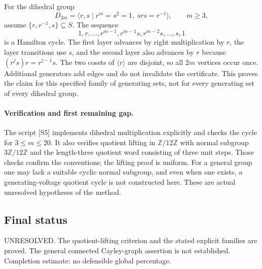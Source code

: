 \documentclass[11pt,a4paper]{article}
\begin{document}
For the dihedral group
\[
 D_{2m}=\langle r,s\mid r^m=s^2=1,\ srs=r^{-1}\rangle,
 \qquad m\ge3,
\]
assume $\{r,r^{-1},s\}\subseteq S$. The sequence
\[
 1,r,\ldots,r^{m-1},r^{m-1}s,r^{m-2}s,\ldots,s,1
\]
is a Hamilton cycle. The first layer advances by right multiplication
by $r$, the layer transitions use $s$, and the second layer also
advances by $r$ because $(r^j s)r=r^{j-1}s$. The two cosets of
$\langle r\rangle$ are disjoint, so all $2m$ vertices occur once.
Additional generators add edges and do not invalidate the certificate.
This proves the claim for this specified family of generating sets,
not for every generating set of every dihedral group.

\paragraph{Verification and first remaining gap.}
The script [S5] implements dihedral multiplication explicitly and checks
the cycle for $3\le m\le20$. It also verifies quotient lifting
in $\mathbb Z/12\mathbb Z$ with normal subgroup $3\mathbb Z/12\mathbb Z$
and the length-three quotient word consisting of three unit steps.
Those checks confirm the conventions; the lifting proof is uniform.
For a general group one may lack a suitable cyclic normal subgroup,
and even when one exists, a generating-voltage quotient cycle is not
constructed here. These are actual unresolved hypotheses of the method.

\subsection{Final status}
UNRESOLVED. The quotient-lifting criterion and the stated explicit
families are proved. The general connected Cayley-graph assertion is
not established. Completion estimate: no defensible global percentage.
\end{document}
